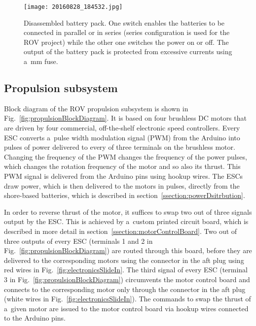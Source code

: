 \begin{figure}[htb]
\begin{minipage}[b]{1\linewidth}
  \centering
	\texttt{[image: 20160828\_184532.jpg]}
\end{minipage}
\caption{Disassembled battery pack. One switch enables the batteries to be connected in parallel or in series (series configuration is used for the ROV project) while the other one switches the power on or off. The output of the battery pack is protected from excessive currents using a~\unit[20]{mm} fuse.}
\label{fig:batteryPack}
\end{figure}

\clearpage %

\subsection{Propulsion subsystem}\label{ssection:propulsionSubsystem}
Block diagram of the ROV propulsion subsystem is shown in Fig.~\ref{fig:propulsionBlockDiagram}. It is based on four brushless DC motors that are driven by four commercial, off-the-shelf electronic speed controllers. Every ESC converts a~pulse width modulation signal (PWM) from the Arduino into pulses of power delivered to every of three terminals on the brushless motor. Changing the frequency of the PWM changes the frequency of the power pulses, which changes the rotation frequency of the motor and so also its thrust. This PWM signal is delivered from the Arduino pins using hookup wires. The ESCs draw power, which is then delivered to the motors in pulses, directly from the shore-based batteries, which is described in section~\ref{ssection:powerDsitrbution}.

In order to reverse thrust of the motor, it suffices to swap two out of three signals output by the ESC. This is achieved by a~custom printed circuit board, which is described in more detail in section~\ref{ssection:motorControlBoard}. Two out of three outputs of every ESC (terminals 1 and 2 in Fig.~\ref{fig:propulsionBlockDiagram}) are routed through this board, before they are delivered to the corresponding motors using the connector in the aft plug using red wires in Fig.~\ref{fig:electronicsSlideIn}. The third signal of every ESC (terminal 3 in Fig.~\ref{fig:propulsionBlockDiagram}) circumvents the motor control board and connects to the corresponding motor only through the connector in the aft plug (white wires in Fig.~\ref{fig:electronicsSlideIn}). The commands to swap the thrust of a~given motor are issued to the motor control board via hookup wires connected to the Arduino pins.

